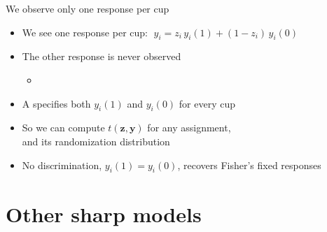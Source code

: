 \documentclass[table, xcolor = {dvipsnames}, 9pt]{beamer}
\theoremstyle{plain}
\newcommand{\mh}[1]{{\color{magenta}{#1}}}
\begin{document}
\begin{frame}{We observe only one response per cup}
\vfill
\begin{itemize} \vfill
\item We see one response per cup: $\; y_i = z_i\,y_i(1) + (1 - z_i)\,y_i(0)$ \vfill
\item The other response is never observed \vfill
\begin{itemize} \vfill
\item \mh{Fundamental Problem of Causal Inference} \citep{holland1986} \vfill
\end{itemize} \vfill
\item A \mh{sharp causal model} specifies both $y_i(1)$ and $y_i(0)$ for every cup \vfill
\item So we can compute $t(\bm{z},\bm{y})$ for any assignment, \\ and its randomization distribution \vfill
\item No discrimination, $y_i(1) = y_i(0)$, recovers Fisher's fixed responses \vfill
\end{itemize} \vfill
\end{frame}
\section{Other sharp models}
\end{document}
